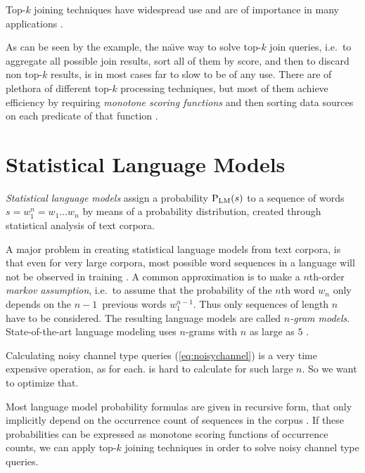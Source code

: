 \begin{draft}
Top-$k$ joining techniques have widespread use and are of importance in
many applications \noref.
\end{draft}

As can be seen by the example, the na\"{\i}ve way to solve top-$k$ join
queries, i.e.\ to aggregate all possible join results, sort all of them by
score, and then to discard non top-$k$ results, is in most cases far to
slow to be of any use.
There are of plethora of different top-$k$ processing techniques, but most
of them achieve efficiency by requiring \emph{monotone scoring functions} and
then sorting data sources on each predicate of that function
\parencite{Ilyas2008}.

\section{Statistical Language Models}

\emph{Statistical language models} assign a probability $\Prob[\text{LM}]{s}$ to
a sequence of words $s = w_1^n = w_1 \ldots w_n$ by means of a probability
distribution, created through statistical analysis of text corpora.

A major problem in creating statistical language models from text corpora, is
that even for very large corpora, most possible word sequences in a language
will not be observed in training \noref.
A common approximation is to make a $n$th-order \emph{markov assumption},
i.e.\ to assume that the probability of the $n$th word $w_n$ only depends on
the $n\!-\!1$~previous words $w_1^{n-1}$.
Thus only sequences of length $n$ have to be considered.
The resulting language models are called \emph{$n$-gram models}.
State-of-the-art language modeling uses $n$-grams with $n$ as large as $5$
\parencite{JurafskyMartin2009,Goodman2001,Stolcke2000}.

\begin{draft}
Calculating noisy channel type queries (\cref{eq:noisychannel}) is a very time
expensive operation, as for each.
 is hard to calculate for such large $n$.
So we want to optimize that.
\end{draft}

Most language model probability formulas are given in recursive form, that only
implicitly depend on the occurrence count of sequences in the corpus \noref.
If these probabilities can be expressed as monotone scoring functions of
occurrence counts, we can apply top-$k$ joining techniques in order to solve
noisy channel type queries.

